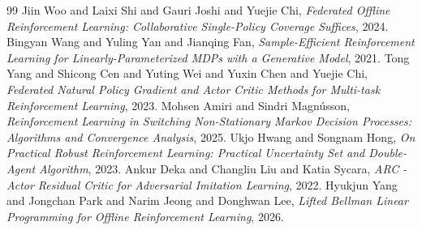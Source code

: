 \documentclass[conference]{IEEEtran}
\begin{document}
\begin{thebibliography}{99}
   Jiin Woo and Laixi Shi and Gauri Joshi and Yuejie Chi, \textit{Federated Offline Reinforcement Learning: Collaborative Single-Policy Coverage Suffices}, 2024.
   Bingyan Wang and Yuling Yan and Jianqing Fan, \textit{Sample-Efficient Reinforcement Learning for Linearly-Parameterized MDPs with a Generative Model}, 2021.
   Tong Yang and Shicong Cen and Yuting Wei and Yuxin Chen and Yuejie Chi, \textit{Federated Natural Policy Gradient and Actor Critic Methods for Multi-task Reinforcement Learning}, 2023.
   Mohsen Amiri and Sindri Magnússon, \textit{Reinforcement Learning in Switching Non-Stationary Markov Decision Processes: Algorithms and Convergence Analysis}, 2025.
   Ukjo Hwang and Songnam Hong, \textit{On Practical Robust Reinforcement Learning: Practical Uncertainty Set and Double-Agent Algorithm}, 2023.
   Ankur Deka and Changliu Liu and Katia Sycara, \textit{ARC - Actor Residual Critic for Adversarial Imitation Learning}, 2022.
   Hyukjun Yang and Jongchan Park and Narim Jeong and Donghwan Lee, \textit{Lifted Bellman Linear Programming for Offline Reinforcement Learning}, 2026.
\end{thebibliography}
\end{document}

